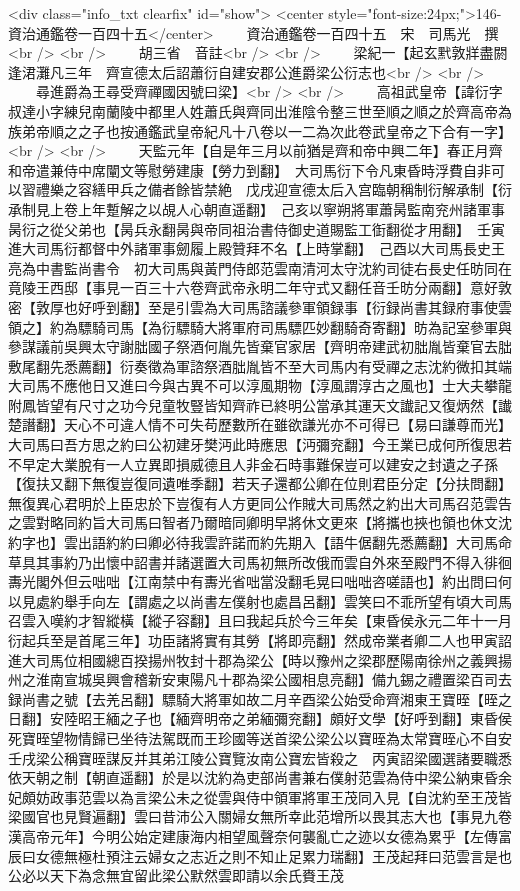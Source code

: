 <div class="info_txt clearfix" id="show">
<center style="font-size:24px;">146-資治通鑑卷一百四十五</center>
  　　資治通鑑卷一百四十五　宋　司馬光　撰<br />
<br />
　　胡三省　音註<br />
<br />
　　梁紀一【起玄黓敦牂盡閼逢涒灘凡三年　齊宣德太后詔蕭衍自建安郡公進爵梁公衍志也<br />
<br />
　　尋進爵為王尋受齊禪國因號曰梁】<br />
<br />
　　高祖武皇帝【諱衍字叔達小字練兒南蘭陵中都里人姓蕭氏與齊同出淮陰令整三世至順之順之於齊高帝為族弟帝順之之子也按通鑑武皇帝紀凡十八卷以一二為次此卷武皇帝之下合有一字】<br />
<br />
　　天監元年【自是年三月以前猶是齊和帝中興二年】春正月齊和帝遣兼侍中席闡文等慰勞建康【勞力到翻】　大司馬衍下令凡東昏時浮費自非可以習禮樂之容繕甲兵之備者餘皆禁絶　戊戌迎宣德太后入宫臨朝稱制衍解承制【衍承制見上卷上年蹔解之以覘人心朝直遥翻】　己亥以寧朔將軍蕭昺監南兖州諸軍事昺衍之從父弟也【昺兵永翻昺與帝同祖治書侍御史道賜監工衘翻從才用翻】　壬寅進大司馬衍都督中外諸軍事劒履上殿贊拜不名【上時掌翻】　己酉以大司馬長史王亮為中書監尚書令　初大司馬與黃門侍郎范雲南清河太守沈約司徒右長史任昉同在竟陵王西邸【事見一百三十六卷齊武帝永明二年守式又翻任音壬昉分兩翻】意好敦密【敦厚也好呼到翻】至是引雲為大司馬諮議參軍領録事【衍録尚書其録府事使雲領之】約為驃騎司馬【為衍驃騎大將軍府司馬驃匹妙翻騎奇寄翻】昉為記室參軍與參謀議前吳興太守謝朏國子祭酒何胤先皆棄官家居【齊明帝建武初朏胤皆棄官去朏敷尾翻先悉薦翻】衍奏徵為軍諮祭酒朏胤皆不至大司馬内有受禪之志沈約微扣其端大司馬不應他日又進曰今與古異不可以淳風期物【淳風謂淳古之風也】士大夫攀龍附鳳皆望有尺寸之功今兒童牧豎皆知齊祚已終明公當承其運天文䜟記又復炳然【䜟楚譖翻】天心不可違人情不可失苟歷數所在雖欲謙光亦不可得已【易曰謙尊而光】大司馬曰吾方思之約曰公初建牙樊沔此時應思【沔彌兖翻】今王業已成何所復思若不早定大業脫有一人立異即損威德且人非金石時事難保豈可以建安之封遺之子孫【復扶又翻下無復豈復同遺唯季翻】若天子還都公卿在位則君臣分定【分扶問翻】無復異心君明於上臣忠於下豈復有人方更同公作賊大司馬然之約出大司馬召范雲告之雲對略同約旨大司馬曰智者乃爾暗同卿明早將休文更來【將攜也挾也領也休文沈約字也】雲出語約約曰卿必待我雲許諾而約先期入【語牛倨翻先悉薦翻】大司馬命草具其事約乃出懷中詔書并諸選置大司馬初無所改俄而雲自外來至殿門不得入徘徊夀光閣外但云咄咄【江南禁中有夀光省咄當没翻毛晃曰咄咄咨嗟語也】約出問曰何以見處約舉手向左【謂處之以尚書左僕射也處昌呂翻】雲笑曰不乖所望有頃大司馬召雲入嘆約才智縱橫【縱子容翻】且曰我起兵於今三年矣【東昏侯永元二年十一月衍起兵至是首尾三年】功臣諸將實有其勞【將即亮翻】然成帝業者卿二人也甲寅詔進大司馬位相國總百揆揚州牧封十郡為梁公【時以豫州之梁郡歷陽南徐州之義興揚州之淮南宣城吳興會稽新安東陽凡十郡為梁公國相息亮翻】備九錫之禮置梁百司去録尚書之號【去羌呂翻】驃騎大將軍如故二月辛酉梁公始受命齊湘東王寶晊【晊之日翻】安陸昭王緬之子也【緬齊明帝之弟緬彌兖翻】頗好文學【好呼到翻】東昏侯死寶晊望物情歸已坐待法駕既而王珍國等送首梁公梁公以寶晊為太常寶晊心不自安壬戌梁公稱寶晊謀反并其弟江陵公寶覽汝南公寶宏皆殺之　丙寅詔梁國選諸要職悉依天朝之制【朝直遥翻】於是以沈約為吏部尚書兼右僕射范雲為侍中梁公納東昏余妃頗妨政事范雲以為言梁公未之從雲與侍中領軍將軍王茂同入見【自沈約至王茂皆梁國官也見賢遍翻】雲曰昔沛公入關婦女無所幸此范增所以畏其志大也【事見九卷漢高帝元年】今明公始定建康海内相望風聲奈何襲亂亡之迹以女德為累乎【左傳富辰曰女德無極杜預注云婦女之志近之則不知止足累力瑞翻】王茂起拜曰范雲言是也公必以天下為念無宜留此梁公默然雲即請以余氏賚王茂